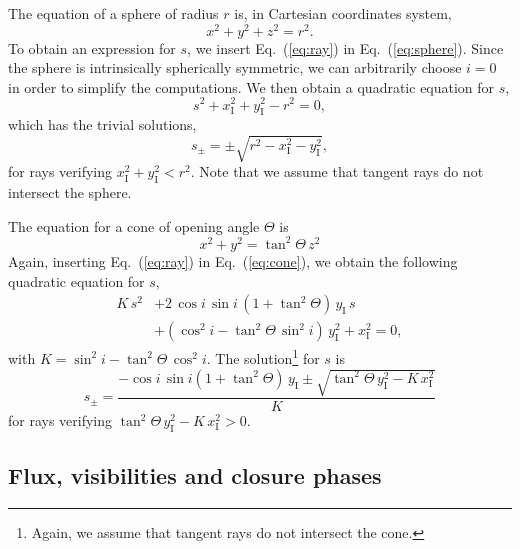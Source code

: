 \documentclass{report}
\newcommand{\cosi}{\cos{i}}
\newcommand{\sini}{\sin{i}}
\newcommand{\cosdi}{\cos^2{i}}
\newcommand{\sindi}{\sin^2{i}}
\newcommand{\tandTheta}{\tan^2{\Theta}}
\newcommand{\xI}{x_\mathrm{I}}
\newcommand{\yI}{y_\mathrm{I}}
\begin{document}
  The equation of a sphere of radius $r$ is, in Cartesian coordinates system,
  \begin{equation}
    x^2 + y^2 + z^2 = r^2. \label{eq:sphere}
  \end{equation}
  To obtain an expression for $s$, we insert Eq.~(\ref{eq:ray}) in Eq.~(\ref{eq:sphere}). Since the sphere is intrinsically spherically symmetric, we can arbitrarily choose $i = 0$ in order to simplify the computations. We then obtain a quadratic equation for $s$,
  \begin{equation}
      s^2 + \xI^2 + \yI^2 - r^2 = 0,
  \end{equation}
  which has the trivial solutions,
  \begin{equation}
      s_\pm = \pm \sqrt{r^2 - \xI^2 - \yI^2},
  \end{equation}
  for rays verifying $\xI^2 + \yI^2 < r^2$. Note that we assume that tangent rays do not intersect the sphere.
  
  The equation for a cone of opening angle $\Theta$ is
  \begin{equation}
    x^2 + y^2 = \tandTheta \, z^2 \label{eq:cone}
  \end{equation}
  Again, inserting Eq.~(\ref{eq:ray}) in Eq.~(\ref{eq:cone}), we obtain the following quadratic equation for $s$,
  \begin{equation}
    \begin{split}
        K \, s^2 &+ 2 \, \cosi \, \sini \, \left( 1 + \tandTheta \right) \, \yI \, s \\ &+ \left( \cosdi - \tandTheta \, \sindi \right) \, \yI^2 + \xI^2 = 0,
      \end{split}
  \end{equation}
  with $K = \sindi - \tandTheta \, \cosdi$. The solution\footnote{Again, we assume that tangent rays do not intersect the cone.} for $s$ is
  \begin{equation}
      s_\pm = \frac{- \cosi \, \sini \left(1 + \tandTheta\right) \, \yI \pm \sqrt{\tandTheta \, \yI^2 - K \, \xI^2}}{K}
  \end{equation}
  for rays verifying $\tandTheta \, \yI^2 - K \, \xI^2 > 0$.

\subsection{Flux, visibilities and closure phases}
\end{document}
